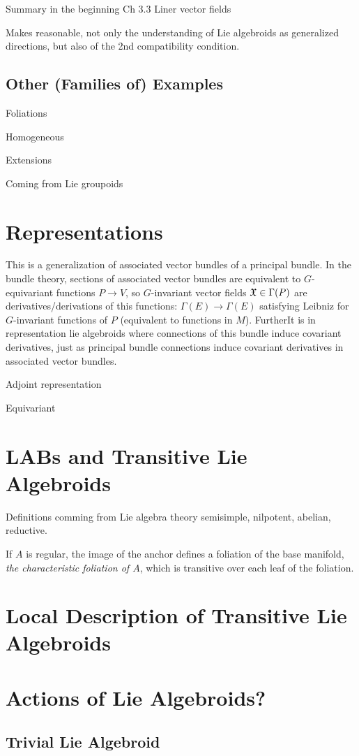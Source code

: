 Summary in the beginning Ch 3.3 Liner vector fields

Makes reasonable, not only the understanding of Lie algebroids as generalized directions, but also of the 2nd compatibility condition.

\subsection{Other (Families of) Examples}

Foliations

Homogeneous

Extensions

Coming from Lie groupoids

\section{Representations}

This is a generalization of associated vector bundles of a principal bundle. In the bundle theory, sections of associated vector bundles are equivalent to $G$-equivariant functions $P \to V$, so $G$-invariant vector fields $\mathfrak{X} \in \Gamma(P)$ are derivatives/derivations of this functions: $\Gamma(E) \to \Gamma(E)$ satisfying Leibniz for $G$-invariant functions of $P$ (equivalent to functions in $M$). FurtherIt is in representation lie algebroids where connections of this bundle induce covariant derivatives, just as principal bundle connections induce covariant derivatives in associated vector bundles.

Adjoint representation

Equivariant
\section{LABs and Transitive Lie Algebroids}

Definitions comming from Lie algebra theory semisimple, nilpotent, abelian, reductive.

If $A$ is regular, the image of the anchor defines a foliation of the base manifold, \emph{the characteristic foliation of $A$}, which is transitive over each leaf of the foliation.

\section{Local Description of Transitive Lie Algebroids}

\section{Actions of Lie Algebroids?}\subsection{Trivial Lie Algebroid}
